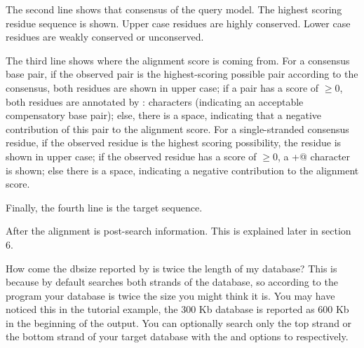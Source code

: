 The second line shows that consensus of the query model. The highest
scoring residue sequence is shown. Upper case residues are highly
conserved. Lower case residues are weakly conserved or unconserved.

The third line shows where the alignment score is coming from. For a
consensus base pair, if the observed pair is the highest-scoring
possible pair according to the consensus, both residues are shown in
upper case; if a pair has a score of $\geq 0$, both residues are
annotated by : characters (indicating an acceptable compensatory base
pair); else, there is a space, indicating that a negative contribution
of this pair to the alignment score. For a single-stranded consensus
residue, if the observed residue is the highest scoring possibility,
the residue is shown in upper case; if the observed residue has a
score of $\geq 0$, a \verb@+@ character is shown; else there is a
space, indicating a negative contribution to the alignment score.

Finally, the fourth line is the target sequence.

After the alignment is post-search information. This is explained
later in section 6. 

\begin{srefaq}{How come the dbsize reported by  is
twice the length of my database?} This is because by default
   searches both strands of the database, so according
  to the program your database is twice the size you might think it
  is. You may have noticed this in the tutorial example, the 300 Kb
  database is reported as 600 Kb in the beginning of the
   output. You can optionally search only the top
  strand or the bottom strand of your target database with the
   and  options to 
  respectively. 
\end{srefaq}

